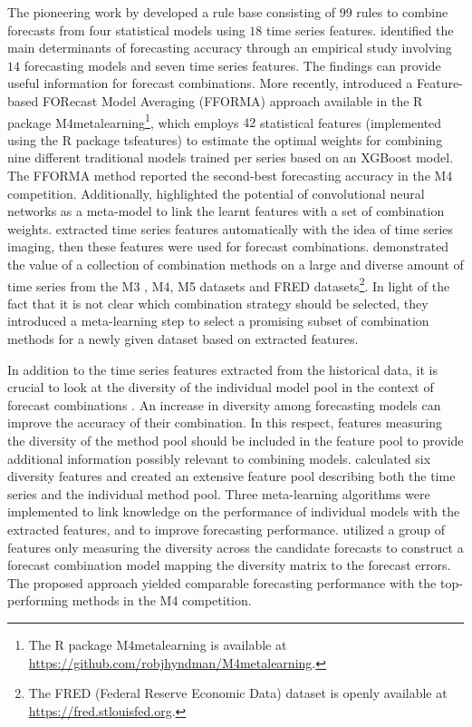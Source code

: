 \documentclass[11pt]{article}
\newcommand{\pkg}[1]{{\normalfont\fontseries{b}\selectfont #1}}
\let\proglang=\textsf
\begin{document}
The pioneering work by \citet{Collopy1992-ey} developed a rule base consisting of $99$ rules to combine forecasts from four statistical models using $18$ time series features. \citet{Petropoulos2014-uy} identified the main determinants of forecasting accuracy through an empirical study involving $14$ forecasting models and seven time series features. The findings can provide useful information for forecast combinations. More recently, \citet{Montero-Manso2020-tq} introduced a Feature-based FORecast Model Averaging (FFORMA) approach available in the \proglang{R} package \pkg{M4metalearning}\footnote{The \proglang{R} package \pkg{M4metalearning} is available at \url{https://github.com/robjhyndman/M4metalearning}.}, which employs $42$ statistical features (implemented using the \proglang{R} package \pkg{tsfeatures}) to estimate the optimal weights for combining nine different traditional models trained per series based on an XGBoost model. The FFORMA method reported the second-best forecasting accuracy in the M4 competition. Additionally, \citet{Ma2021-np} highlighted the potential of convolutional neural networks as a meta-model to link the learnt features with a set of combination weights. \citet{Li2020-od} extracted time series features automatically with the idea of time series imaging, then these features were used for forecast combinations. \citet{Gastinger2021-ey} demonstrated the value of a collection of combination methods on a large and diverse amount of time series from the M3 \citep{Makridakis2000-he}, M4, M5 \citep{Makridakis2020-fn} datasets and FRED datasets\footnote{The FRED (Federal Reserve Economic Data) dataset is openly available at \url{https://fred.stlouisfed.org}.}. In light of the fact that it is not clear which combination strategy should be selected, they introduced a meta-learning step to select a promising subset of combination methods for a newly given dataset based on extracted features.

In addition to the time series features extracted from the historical data, it is crucial to look at the diversity of the individual model pool in the context of forecast combinations \citep{Batchelor1995-ps,Thomson2019-al,Atiya2020-ge,Lichtendahl2020-ut}. An increase in diversity among forecasting models can improve the accuracy of their combination. In this respect, features measuring the diversity of the method pool should be included in the feature pool to provide additional information possibly relevant to combining models. \citet{Lemke2010-wn} calculated six diversity features and created an extensive feature pool describing both the time series and the individual method pool. Three meta-learning algorithms were implemented to link knowledge on the performance of individual models with the extracted features, and to improve forecasting performance. \citet{Kang2021-ol} utilized a group of features only measuring the diversity across the candidate forecasts to construct a forecast combination model mapping the diversity matrix to the forecast errors. The proposed approach yielded comparable forecasting performance with the top-performing methods in the M4 competition.
\end{document}
